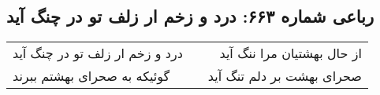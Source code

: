 \begin{center}
\section*{رباعی شماره ۶۶۳: درد و زخم ار زلف تو در چنگ آید}
\label{sec:0663}
\begin{longtable}{l p{0.5cm} r}
درد و زخم ار زلف تو در چنگ آید
&&
از حال بهشتیان مرا ننگ آید
\\
گوئیکه به صحرای بهشتم ببرند
&&
صحرای بهشت بر دلم تنگ آید
\\
\end{longtable}
\end{center}
